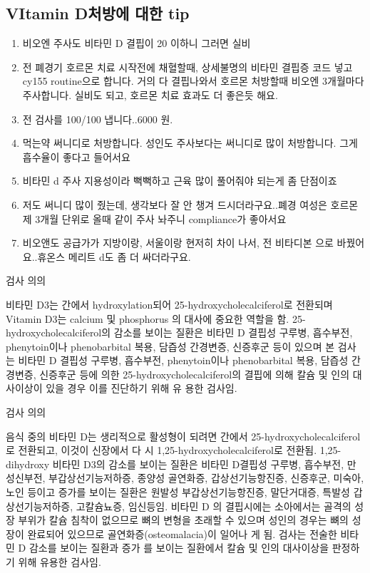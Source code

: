 \subsection{VItamin D처방에 대한 tip}
\begin{enumerate}\tightlist
\item 비오엔 주사도 비타민 D 결핍이 20 이하니 그러면 실비
\item 전 폐경기 호르몬 치료 시작전에 채혈할때,   상세불명의 비타민 결핍증 코드 넣고 cy155 routine으로 합니다. 거의 다 결핍나와서 호르몬 처방할때  비오엔  3개월마다 주사합니다. 실비도 되고, 호르몬 치료 효과도 더 좋은듯 해요.
\item 전 검사를 100/100 냅니다..6000 원.
\item 먹는약 써니디로 처방합니다. 성인도 주사보다는 써니디로 많이 처방합니다. 그게 흡수율이 좋다고 들어서요
\item 비타민 d 주사 지용성이라 뻑뻑하고 근육 많이 풀어줘야 되는게 좀 단점이죠
\item 저도 써니디 많이 줬는데, 생각보다 잘 안 챙겨 드시더라구요..폐경 여성은 호르몬제  3개월 단위로 올때 같이 주사 놔주니 compliance가 좋아서요
\item 비오앤도 공급가가 지방이랑, 서울이랑 현저히 차이 나서, 전 비타디본 으로 바꿨어요..휴온스 메리트 d도 좀 더 싸더라구요.
\end{enumerate}


 검사 의의 \par
비타민 D3는 간에서 hydroxylation되어 25-hydroxycholecalciferol로 전환되며 Vitamin D3는 calcium 및 phosphorus 의 대사에 중요한 역할을 함. 
25-hydroxycholecalciferol의 감소를 보이는 질환은 비타민 D 결핍성 구루병, 흡수부전, phenytoin이나 phenobarbital 복용, 담즙성 간경변증, 신증후군 등이 있으며 본 검사는 비타민 D 결핍성 구루병, 흡수부전,
 phenytoin이나 phenobarbital 복용, 담즙성 간경변증, 신증후군 등에 의한 25-hydroxycholecalciferol의 결핍에 의해 칼슘 및 인의 대사이상이 있을 경우 이를 진단하기 위해 유 용한 검사임.



 검사 의의 \par
음식 중의 비타민 D는 생리적으로 활성형이 되려면 간에서 25-hydroxycholecalciferol로 전환되고, 
이것이 신장에서 다 시 1,25-hydroxycholecalciferol로 전환됨.
 1,25-dihydroxy 비타민 D3의 감소를 보이는 질환은 비타민 D결핍성 구루병, 흡수부전, 만성신부전, 부갑상선기능저하증, 종양성 골연화증, 갑상선기능항진증, 신증후군, 미숙아, 노인 등이고 
 증가를 보이는 질환은 원발성 부갑상선기능항진증, 말단거대증, 특발성 갑상선기능저하증, 고칼슘뇨증, 임신등임. 비타민 D 의 결핍시에는 소아에서는 골격의 성장 부위가 칼슘 침착이 없으므로 뼈의 변형을 초래할 수 있으며 성인의 경우는 뼈의 성장이 완료되어 있으므로 골연화증(osteomalacia)이 일어나 게 됨. 검사는 전술한 비타민 D 감소를 보이는 질환과 증가 를 보이는 질환에서 칼슘 및 인의 대사이상을 판정하기 위해
유용한 검사임.


